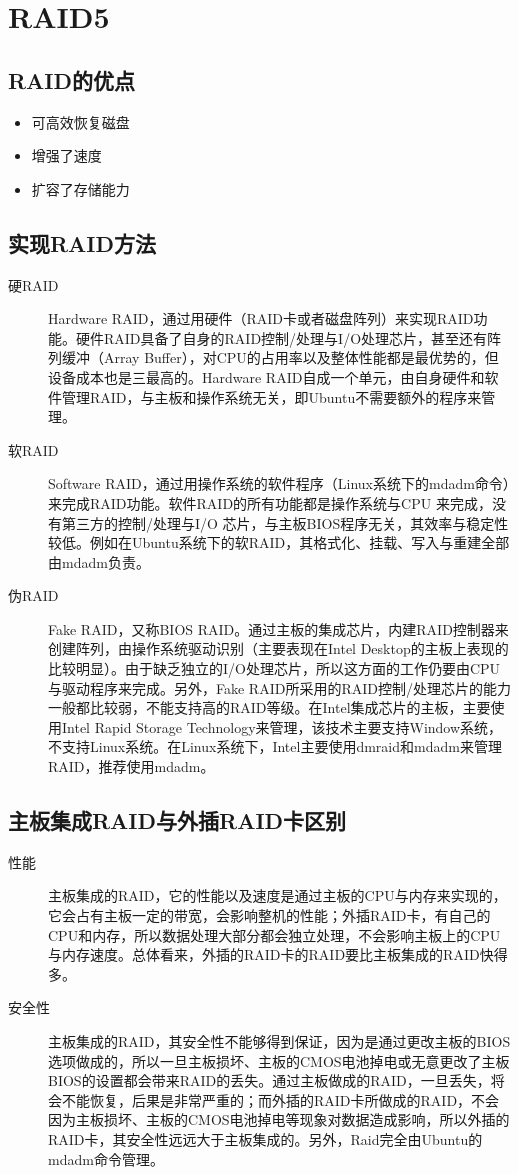 \section{RAID5}
\subsection{RAID的优点}
\begin{itemize}
\item 可高效恢复磁盘
\item 增强了速度
\item 扩容了存储能力
\end{itemize}

\subsection{实现RAID方法}
\begin{description}
\item[硬RAID] Hardware RAID，通过用硬件（RAID卡或者磁盘阵列）来实现RAID功能。硬件RAID具备了自身的RAID控制/处理与I/O处理芯片，甚至还有阵列缓冲（Array Buffer），对CPU的占用率以及整体性能都是最优势的，但设备成本也是三最高的。Hardware RAID自成一个单元，由自身硬件和软件管理RAID，与主板和操作系统无关，即Ubuntu不需要额外的程序来管理。
\item[软RAID] Software RAID，通过用操作系统的软件程序（Linux系统下的mdadm命令）来完成RAID功能。软件RAID的所有功能都是操作系统与CPU 来完成，没有第三方的控制/处理与I/O 芯片，与主板BIOS程序无关，其效率与稳定性较低。例如在Ubuntu系统下的软RAID，其格式化、挂载、写入与重建全部由mdadm负责。
\item[伪RAID] Fake RAID，又称BIOS RAID。通过主板的集成芯片，内建RAID控制器来创建阵列，由操作系统驱动识别（主要表现在Intel Desktop的主板上表现的比较明显）。由于缺乏独立的I/O处理芯片，所以这方面的工作仍要由CPU与驱动程序来完成。另外，Fake RAID所采用的RAID控制/处理芯片的能力一般都比较弱，不能支持高的RAID等级。在Intel集成芯片的主板，主要使用Intel Rapid Storage Technology来管理，该技术主要支持Window系统，不支持Linux系统。在Linux系统下，Intel主要使用dmraid和mdadm来管理RAID，推荐使用mdadm。
\end{description}

\subsection{主板集成RAID与外插RAID卡区别}
\begin{description}
\item[性能] 主板集成的RAID，它的性能以及速度是通过主板的CPU与内存来实现的，它会占有主板一定的带宽，会影响整机的性能；外插RAID卡，有自己的CPU和内存，所以数据处理大部分都会独立处理，不会影响主板上的CPU与内存速度。总体看来，外插的RAID卡的RAID要比主板集成的RAID快得多。
\item[安全性] 主板集成的RAID，其安全性不能够得到保证，因为是通过更改主板的BIOS选项做成的，所以一旦主板损坏、主板的CMOS电池掉电或无意更改了主板BIOS的设置都会带来RAID的丢失。通过主板做成的RAID，一旦丢失，将会不能恢复，后果是非常严重的；而外插的RAID卡所做成的RAID，不会因为主板损坏、主板的CMOS电池掉电等现象对数据造成影响，所以外插的RAID卡，其安全性远远大于主板集成的。另外，Raid完全由Ubuntu的mdadm命令管理。
\end{description}


